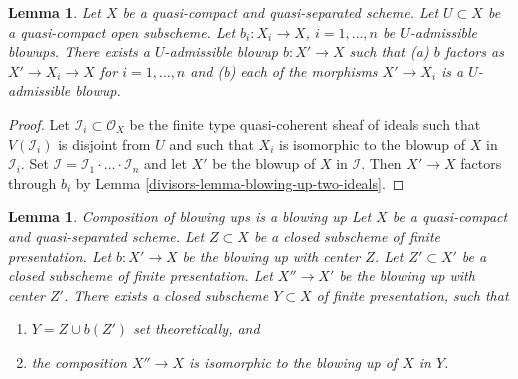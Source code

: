 \documentclass{amsart}
\newenvironment{slogan}{\comment}{\endcomment}
\theoremstyle{plain}
\newtheorem{lemma}[subsection]{Lemma}
\theoremstyle{definition}
\theoremstyle{remark}
\numberwithin{equation}{subsection}
\begin{document}
\begin{lemma}
\label{divisors-lemma-dominate-admissible-blowups}
Let $X$ be a quasi-compact and quasi-separated scheme.
Let $U \subset X$ be a quasi-compact open subscheme.
Let $b_i : X_i \to X$, $i = 1, \ldots, n$ be $U$-admissible blowups.
There exists a $U$-admissible blowup $b : X' \to X$ such that
(a) $b$ factors as $X' \to X_i \to X$ for $i = 1, \ldots, n$ and
(b) each of the morphisms $X' \to X_i$ is a $U$-admissible blowup.
\end{lemma}

\begin{proof}
Let $\mathcal{I}_i \subset \mathcal{O}_X$ be the finite type
quasi-coherent sheaf of ideals such that $V(\mathcal{I}_i)$ is
disjoint from $U$ and such that $X_i$ is isomorphic to the
blowup of $X$ in $\mathcal{I}_i$. Set
$\mathcal{I} = \mathcal{I}_1 \cdot \ldots \cdot \mathcal{I}_n$
and let $X'$ be the blowup of $X$ in $\mathcal{I}$. Then
$X' \to X$ factors through $b_i$ by Lemma \ref{divisors-lemma-blowing-up-two-ideals}.
\end{proof}


\begin{lemma}
\label{divisors-lemma-composition-finite-type-blowups}
\begin{slogan}
Composition of blowing ups is a blowing up
\end{slogan}
Let $X$ be a quasi-compact and quasi-separated scheme.
Let $Z \subset X$ be a closed subscheme of finite presentation.
Let $b : X' \to X$ be the blowing up with center $Z$. Let $Z' \subset X'$ be
a closed subscheme of finite presentation.
Let $X'' \to X'$ be the blowing up with center $Z'$.
There exists a closed subscheme $Y \subset X$ of finite presentation,
such that
\begin{enumerate}
\item $Y = Z \cup b(Z')$ set theoretically, and
\item the composition $X'' \to X$ is isomorphic to the blowing up
of $X$ in $Y$.
\end{enumerate}
\end{lemma}
\end{document}
